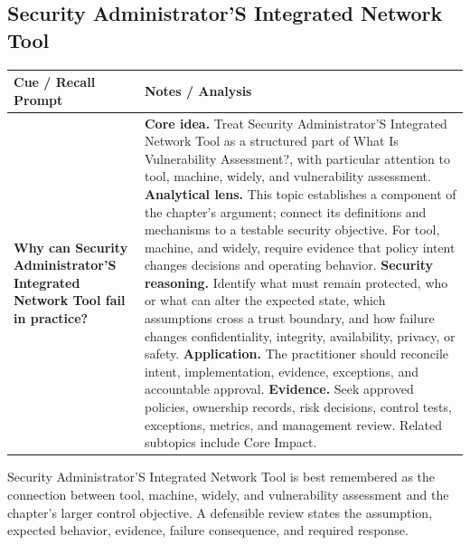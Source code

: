 \documentclass[11pt]{article}
\newcommand{\CornellHeader}{%
\rowcolor{Navy}\color{white}\bfseries Cue / Recall Prompt & \color{white}\bfseries Notes / Analysis\\\hline}
\newcommand{\CornellRow}[2]{%
\cellcolor{CueGray}\RaggedRight\textbf{#1} & \RaggedRight #2\\\hline}
\begin{document}
\subsection*{Security Administrator'S Integrated Network Tool}
\begin{longtable}{>{\RaggedRight\arraybackslash}p{}|>{\RaggedRight\arraybackslash}p{}}
\CornellHeader
\CornellRow{Why can Security Administrator'S Integrated Network Tool fail in practice?}{\textbf{Core idea.} Treat Security Administrator'S Integrated Network Tool as a structured part of What Is Vulnerability Assessment?, with particular attention to tool, machine, widely, and vulnerability assessment. \textbf{Analytical lens.} This topic establishes a component of the chapter's argument; connect its definitions and mechanisms to a testable security objective. For tool, machine, and widely, require evidence that policy intent changes decisions and operating behavior. \textbf{Security reasoning.} Identify what must remain protected, who or what can alter the expected state, which assumptions cross a trust boundary, and how failure changes confidentiality, integrity, availability, privacy, or safety. \textbf{Application.} The practitioner should reconcile intent, implementation, evidence, exceptions, and accountable approval. \textbf{Evidence.} Seek approved policies, ownership records, risk decisions, control tests, exceptions, metrics, and management review. Related subtopics include Core Impact.}
\end{longtable}
\begin{topicsummary}
Security Administrator'S Integrated Network Tool is best remembered as the connection between tool, machine, widely, and vulnerability assessment and the chapter's larger control objective. A defensible review states the assumption, expected behavior, evidence, failure consequence, and required response.
\end{topicsummary}
\end{document}
